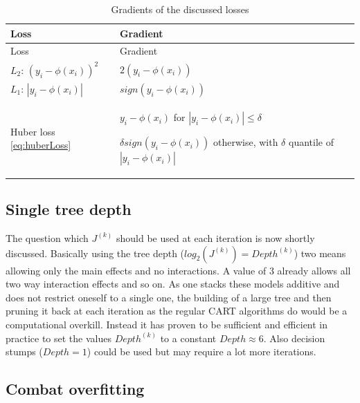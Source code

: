 \documentclass[
]{book}
\begin{document}
\begin{longtable}[]{@{}
  >{\raggedright\arraybackslash}p{}
  >{\raggedright\arraybackslash}p{}@{}}
\caption{\label{tab:lossGradients} Gradients of the discussed losses \citep{elements}}\tabularnewline
\toprule
Loss & Gradient \\
\midrule
\endfirsthead
\toprule
Loss & Gradient \\
\midrule
\endhead
\(L_2\): \((y_i - \phi(x_i))^2\) & \(2(y_i - \phi(x_i))\) \\
\(L_1\): \(|y_i - \phi(x_i)|\) & \(sign(y_i - \phi(x_i))\) \\
Huber loss \eqref{eq:huberLoss} & \(y_i - \phi(x_i)\) for \(|y_i - \phi(x_i)| \leq \delta\)

\(\delta sign(y_i - \phi(x_i))\) otherwise, with \(\delta\) quantile of \(|y_i - \phi(x_i)|\) \\
\bottomrule
\end{longtable}

\hypertarget{single-tree-depth}{%
\subsection{Single tree depth}\label{single-tree-depth}}

The question which \(J^{(k)}\) should be used at each iteration is now shortly discussed. Basically using the tree depth (\(log_2(J^{(k)}) = Depth^{(k)}\)) two means allowing only the main effects and no interactions. A value of 3 already allows all two way interaction effects and so on. As one stacks these models additive and does not restrict oneself to a single one, the building of a large tree and then pruning it back at each iteration as the regular CART algorithms do would be a computational overkill. Instead it has proven to be sufficient and efficient in practice to set the values \(Depth^{(k)}\) to a constant \(Depth \approx 6\).\citep{elements} Also decision stumps (\(Depth = 1\)) could be used but may require a lot more iterations.

\hypertarget{combOver}{%
\subsection{Combat overfitting}\label{combOver}}
\end{document}
